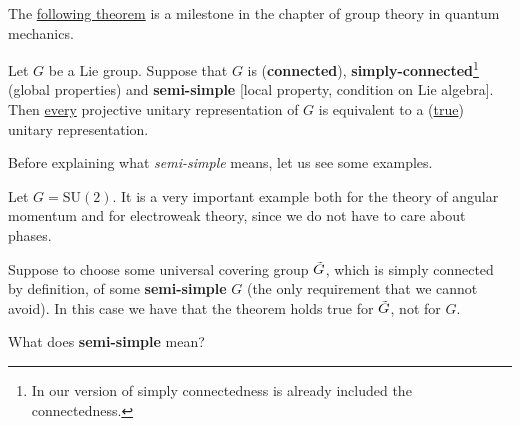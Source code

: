 \documentclass[../main.tex]{subfiles}
\begin{document}
The \href{https://en.wikipedia.org/wiki/Projective_representation\#Infinite-dimensional_projective_unitary_representations:_Bargmann's_theorem}{following theorem} is a milestone in the chapter of group theory in quantum mechanics.
\begin{theorem}
Let $G$ be a Lie group. Suppose that $G$ is (\textbf{connected}), \textbf{simply-connected}\footnote{In our version of simply connectedness is already included the connectedness.} (global properties) and \textbf{semi-simple} [local property, condition on Lie algebra]. Then \underline{every} projective unitary representation of $G$ is equivalent to a (\underline{true}) unitary representation.
\end{theorem}
Before explaining what \textit{semi-simple} means, let us see some examples.
\begin{example}
Let $G=\textrm{SU}(2)$. It is a very important example both for the theory of angular momentum and for electroweak theory, since we do not have to care about phases.
\end{example}
\begin{example}
Suppose to choose some universal covering group $\Tilde{G}$, which is simply connected by definition, of some \textbf{semi-simple} $G$ (the only requirement that we cannot avoid). In this case we have that the theorem holds true for $\Tilde{G}$, not for $G$.
\end{example}
 What does \textbf{semi-simple} mean?
\end{document}
